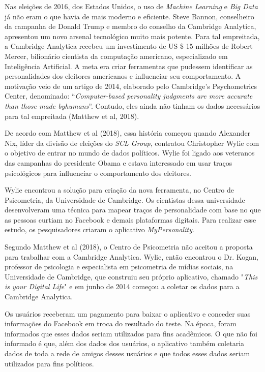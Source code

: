 Nas eleições de 2016, dos Estados Unidos, o uso de \emph{Machine
Learning} e \emph{Big Data} já não eram o que havia de mais moderno e
eficiente. Steve Bannon, conselheiro da campanha de Donald Trump e
membro do conselho da Cambridge Analytica, apresentou um novo arsenal
tecnológico muito mais potente. Para tal empreitada, a Cambridge
Analytica recebeu um investimento de US \$ 15 milhões de Robert Mercer,
bilionário cientista da computação americano, especializado em
Inteligência Artificial. A meta era criar ferramentas que pudessem
identificar as personalidades dos eleitores americanos e influenciar seu
comportamento. A motivação veio de um artigo de 2014, elaborado pelo
Cambridge's Psychometrics Center, denominado: ``\emph{Computer-based
personality judgments are more accurate than those made byhumans}''.
Contudo, eles ainda não tinham os dados necessários para tal empreitada
(Matthew et al, 2018).

De acordo com Matthew et al (2018), essa história começou quando
Alexander Nix, líder da divisão de eleições do \emph{SCL Group},
contratou Christopher Wylie com o objetivo de entrar no mundo de dados
políticos. Wylie foi ligado aos veteranos das campanhas do presidente
Obama e estava interessado em usar traços psicológicos para influenciar
o comportamento dos eleitores.

Wylie encontrou a solução para criação da nova ferramenta, no Centro de
Psicometria, da Universidade de Cambridge. Os cientistas dessa
universidade desenvolveram uma técnica para mapear traços de
personalidade com base no que as pessoas curtiam no Facebook e demais
plataformas digitais. Para realizar esse estudo, os pesquisadores
criaram o aplicativo \emph{MyPersonality}.

Segundo Matthew et al (2018), o Centro de Psicometria não aceitou a
proposta para trabalhar com a Cambridge Analytica. Wylie, então
encontrou o Dr. Kogan, professor de psicologia e especialista em
psicometria de mídias sociais, na Universidade de Cambridge, que
construiu seu próprio aplicativo, chamado "\emph{This is your Digital
Life}" e em junho de 2014 começou a coletar os dados para a Cambridge
Analytica.

Os usuários receberam um pagamento para baixar o aplicativo e conceder
suas informações do Facebook em troca do resultado do teste. Na época,
foram informados que esses dados seriam utilizados para fins acadêmicos.
O que não foi informado é que, além dos dados dos usuários, o aplicativo
também coletaria dados de toda a rede de amigos desses usuários e que
todos esses dados seriam utilizados para fins políticos.

